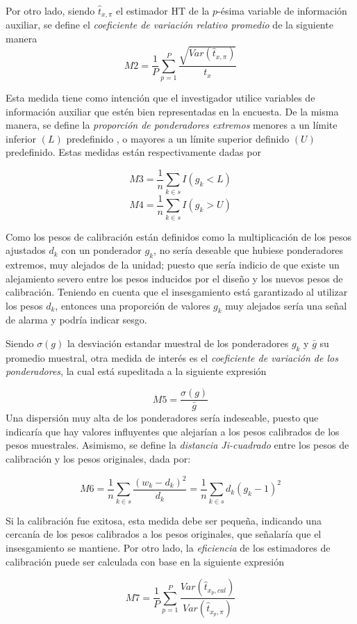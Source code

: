 \documentclass[
  12pt,
]{book}
\begin{document}
Por otro lado, siendo \(\hat{t}_{x, \pi}\) el estimador HT de la \(p\)-ésima variable de información auxiliar, se define el \emph{coeficiente de variación relativo promedio} de la siguiente manera
\[
M2= \frac{1}{P} \sum_{p=1}^P \frac{\sqrt{Var(\hat{t}_{x,\pi})}}{t_x} 
\]

Esta medida tiene como intención que el investigador utilice variables de información auxiliar que estén bien representadas en la encuesta. De la misma manera, se define la \emph{proporción de ponderadores extremos} menores a un límite inferior \((L)\) predefinido , o mayores a un límite superior definido \((U)\) predefinido. Estas medidas están respectivamente dadas por

\[
M3 = \frac{1}{n} \sum_{k \in s}I(g_k<L)
\]
\[
M4= \frac{1}{n} \sum_{k \in s}I(g_k>U)
\]

Como los pesos de calibración están definidos como la multiplicación de los pesos ajustados \(d_{k}\) con un ponderador \(g_k\), no sería deseable que hubiese ponderadores extremos, muy alejados de la unidad; puesto que sería indicio de que existe un alejamiento severo entre los pesos inducidos por el diseño y los nuevos pesos de calibración. Teniendo en cuenta que el insesgamiento está garantizado al utilizar los pesos \(d_k\), entonces una proporción de valores \(g_k\) muy alejados sería una señal de alarma y podría indicar sesgo.

Siendo \(\sigma(g)\) la desviación estandar muestral de los ponderadores \(g_k\) y \(\bar{g}\) su promedio muestral, otra medida de interés es el \emph{coeficiente de variación de los ponderadores}, la cual está supeditada a la siguiente expresión

\[
M5= \frac{\sigma(g)}{\bar{g}}
\]
Una dispersión muy alta de los ponderadores sería indeseable, puesto que indicaría que hay valores influyentes que alejarían a los pesos calibrados de los pesos muestrales. Asimismo, se define la \emph{distancia Ji-cuadrado} entre los pesos de calibración y los pesos originales, dada por:

\[
M6 = \frac{1}{n}\sum_{k \in s} \frac{(w_k - d_k)^2}{d_k}
= \frac{1}{n}\sum_{k \in s} d_k(g_k - 1)^2
\]

Si la calibración fue exitosa, esta medida debe ser pequeña, indicando una cercanía de los pesos calibrados a los pesos originales, que señalaría que el insesgamiento se mantiene. Por otro lado, la \emph{eficiencia} de los estimadores de calibración puede ser calculada con base en la siguiente expresión

\[
M7 = \frac{1}{P}\sum_{p=1}^P \frac{Var(\hat{t}_{x_p, cal})}{Var(\hat{t}_{x_p, \pi})} 
\]
\end{document}
